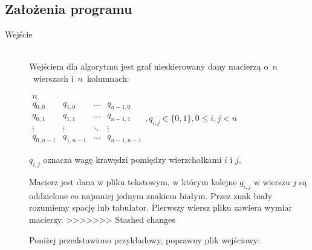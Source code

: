 \documentclass[12pt, a4paper]{article}
\begin{document}
\subsection{Założenia programu}
\begin{description}
	\item[Wejście] \hfill \\
Wejściem dla algorytmu jest graf nieskierowany dany macierzą o~$n$~wierszach i~$n$~kolumnach:

\bigskip
$ 
\begin{array}{llll}
n \\
q_{0,0} & q_{1,0} & \ldots & q_{n-1,0} \\
q_{0,1} & q_{1,1} & \ldots & q_{n-1,1} \\
\vdots  & \vdots  & \ddots & \vdots  \\
q_{0,n-1} & q_{1,n-1} & \ldots & q_{n-1,n-1} 
\end{array}
, q_{i,j} \in \{0,1\}, 0 \leq i,j < n
$
\bigskip

$q_{i,j}$ oznacza wagę krawędzi pomiędzy wierzchołkami $i$ i $j$.
\par\vspace{\baselineskip}
Macierz jest dana w pliku tekstowym, w którym kolejne $q_{i,j}$ w wierszu $j$ są oddzielone co najmniej jednym znakiem białym. Przez znak biały rozumiemy
spację lub tabulator. Pierwszy wiersz pliku zawiera wymiar macierzy.
>>>>>>> Stashed changes

Poniżej przedstawiono przykładowy, poprawny plik wejściowy:


\end{description}
\end{document}
